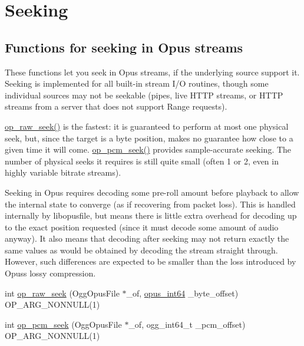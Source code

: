 \hypertarget{group__stream__seeking}{}\section{Seeking}
\label{group__stream__seeking}
\subsection*{Functions for seeking in Opus streams}
\label{_amgrp8473e007a1dbf141b8dfa72682bbc9ed}%
These functions let you seek in Opus streams, if the underlying source support it. Seeking is implemented for all built-\/in stream I/O routines, though some individual sources may not be seekable (pipes, live H\+T\+TP streams, or H\+T\+TP streams from a server that does not support {\ttfamily Range} requests).

\hyperlink{group__stream__seeking_gaf83b0fc6cdf94508876a206ab980851a}{op\+\_\+raw\+\_\+seek()} is the fastest\+: it is guaranteed to perform at most one physical seek, but, since the target is a byte position, makes no guarantee how close to a given time it will come. \hyperlink{group__stream__seeking_gad4f20d0601c2bab8d724f647673ae92c}{op\+\_\+pcm\+\_\+seek()} provides sample-\/accurate seeking. The number of physical seeks it requires is still quite small (often 1 or 2, even in highly variable bitrate streams).

Seeking in Opus requires decoding some pre-\/roll amount before playback to allow the internal state to converge (as if recovering from packet loss). This is handled internally by {\ttfamily libopusfile}, but means there is little extra overhead for decoding up to the exact position requested (since it must decode some amount of audio anyway). It also means that decoding after seeking may not return exactly the same values as would be obtained by decoding the stream straight through. However, such differences are expected to be smaller than the loss introduced by Opus\textquotesingle{}s lossy compression. \begin{DoxyCompactItemize}
\item 
int \hyperlink{group__stream__seeking_gaf83b0fc6cdf94508876a206ab980851a}{op\+\_\+raw\+\_\+seek} (Ogg\+Opus\+File $\ast$\+\_\+of, \hyperlink{opus__types_8h_ab6742070cf9d0ccffca2b80522b4f41a}{opus\+\_\+int64} \+\_\+byte\+\_\+offset) O\+P\+\_\+\+A\+R\+G\+\_\+\+N\+O\+N\+N\+U\+LL(1)
\item 
int \hyperlink{group__stream__seeking_gad4f20d0601c2bab8d724f647673ae92c}{op\+\_\+pcm\+\_\+seek} (Ogg\+Opus\+File $\ast$\+\_\+of, ogg\+\_\+int64\+\_\+t \+\_\+pcm\+\_\+offset) O\+P\+\_\+\+A\+R\+G\+\_\+\+N\+O\+N\+N\+U\+LL(1)
\end{DoxyCompactItemize}


